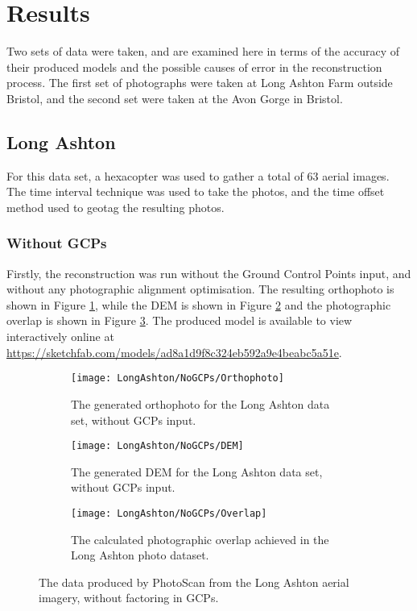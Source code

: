 \section{Results}

Two sets of data were taken, and are examined here in terms of the accuracy of
their produced models and the possible causes of error in the reconstruction
process. The first set of photographs were taken at Long Ashton Farm outside
Bristol, and the second set were taken at the Avon Gorge in Bristol.

\subsection{Long Ashton}

For this data set, a hexacopter was used to gather a total of 63 aerial images.
The time interval technique was used to take the photos, and the time offset
method used to geotag the resulting photos.

\subsubsection{Without GCPs}
\label{sec:results/long-ashton/no-gcp}

Firstly, the reconstruction was run without the Ground Control Points input, and
without any photographic alignment optimisation. The resulting orthophoto is
shown in Figure \ref{img:long-ashton/no-gcps/orthophoto}, while the DEM is shown
in Figure \ref{img:long-ashton/no-gcps/dem} and the photographic overlap is shown
in Figure \ref{img:long-ashton/no-gcps/overlap}. The produced model is available
to view interactively online at
\url{https://sketchfab.com/models/ad8a1d9f8c324eb592a9e4beabc5a51e}.

\begin{figure}
    \centering
    \begin{subfigure}[b]{0.3\textwidth}
        \texttt{[image: LongAshton/NoGCPs/Orthophoto]}
        \caption{The generated orthophoto for the Long Ashton data set, without
        GCPs input.}
        \label{img:long-ashton/no-gcps/orthophoto}
    \end{subfigure}
    \begin{subfigure}[b]{0.3\textwidth}
        \texttt{[image: LongAshton/NoGCPs/DEM]}
        \caption{The generated DEM for the Long Ashton data set, without GCPs
        input.}
        \label{img:long-ashton/no-gcps/dem}
    \end{subfigure}
    \begin{subfigure}[b]{0.3\textwidth}
        \texttt{[image: LongAshton/NoGCPs/Overlap]}
        \caption{The calculated photographic overlap achieved in the Long Ashton
        photo dataset.}
        \label{img:long-ashton/no-gcps/overlap}
    \end{subfigure}
    \caption{The data produced by PhotoScan from the Long Ashton aerial imagery,
    without factoring in GCPs.}
    \label{img:long-ashton/no-gcps}
\end{figure}

